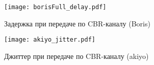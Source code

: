     \begin{figure}[h]
        \begin{center}
            \texttt{[image: borisFull\_delay.pdf]}
        \end{center}
        \caption{Задержка при передаче по CBR-каналу (Boris)}
        \label{fig:borisFulldelay}
    \end{figure}

    \begin{figure}[h]
        \begin{center}
            \texttt{[image: akiyo\_jitter.pdf]}
        \end{center}
        \caption{Джиттер при передаче по CBR-каналу (akiyo)}
        \label{fig:akiyojitter}
    \end{figure}
